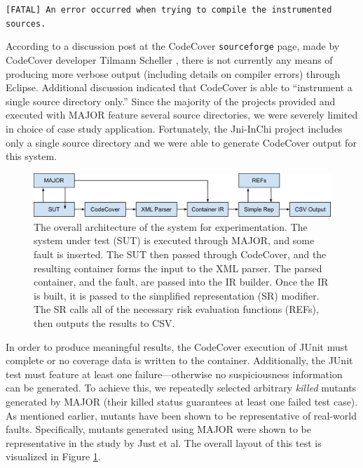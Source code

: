 \vspace{5mm}
\texttt{[FATAL] An error occurred when trying to compile the instrumented sources.}
\vspace{2mm}

According to a discussion post at the CodeCover \texttt{sourceforge}
page, made by CodeCover developer Tilmann Scheller \cite{discpost}, there is not currently any 
means of producing more verbose output (including details on compiler errors) through Eclipse.  
Additional discussion indicated that CodeCover is able to ``instrument
a single source directory only.''  Since the majority of the projects provided and executed with MAJOR
feature several source directories, we were severely limited in choice of case study application.  
Fortunately, the Jni-InChi project includes only a single source directory and we were able
to generate CodeCover output for this system.

\begin{figure}
\centering
\includegraphics[width=0.9\linewidth]{img/Architecture.pdf}
\caption{The overall architecture of the system for experimentation.  The system under test (SUT) is executed through MAJOR, and some fault is inserted.  The SUT then passed through CodeCover, and the resulting container forms the input to the XML parser.  The parsed container, and the fault, are passed into the IR builder.  Once the IR is built, it is passed to the simplified representation (SR) modifier.  The SR calls all of the necessary risk evaluation functions (REFs), then outputs the results to CSV.}
\label{fig:arch}
\end{figure}

In order to produce meaningful results, the CodeCover execution of JUnit must complete or no coverage
data is written to the container.  Additionally, the JUnit test must
feature at least one failure---otherwise no
suspiciousness information can be generated.  To achieve this, we repeatedly selected
arbitrary \textit{killed} mutants generated by MAJOR (their killed status guarantees at least one failed
test case).  As mentioned earlier, mutants have been shown to be representative of real-world faults.  
Specifically, mutants generated using MAJOR were shown to be representative in the study by Just et al.
\cite{mutants}  The overall layout of this test is visualized in Figure \ref{fig:arch}.

